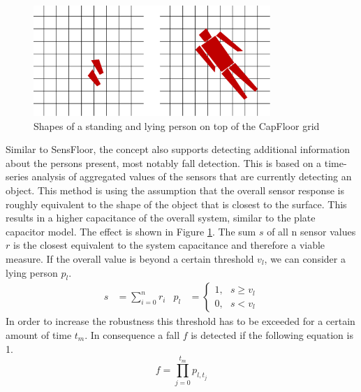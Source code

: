 \begin{figure}[h]
\centering
\includegraphics[width=0.8\textwidth]{images/floor_shapes}
\caption{Shapes of a standing and lying person on top of the CapFloor grid}
\label{fig:capfloor_shapes}
\end{figure}

Similar to SensFloor, the concept also supports detecting additional information about the persons present, most notably fall detection. This is based on a time-series analysis of aggregated values of the sensors that are currently detecting an object. This method is using the assumption that the overall sensor response is roughly equivalent to the shape of the object that is closest to the surface. This results in a higher capacitance of the overall system, similar to the plate capacitor model. The effect is shown in Figure \ref{fig:capfloor_shapes}. The sum $s$ of all n sensor values $r$ is the closest equivalent to the system capacitance and therefore a viable measure. If the overall value is beyond a certain threshold $v_l$, we can consider a lying person $p_l$.
\begin{align}
s&=\sum^n_{i=0}{r_i} & p_l&=\left\{ \begin{array}{c}
1,\ \ \ s\ge v_l \\ 
0,\ \ \ s<v_l \end{array}
\right.
\end{align}
In order to increase the robustness this threshold has to be exceeded for a certain amount of time $t_m$. In consequence a fall $f$ is detected if the following equation is 1.
\begin{equation}
f=\prod^{t_m}_{j=0}{p_{l,t_j}}
\end{equation}